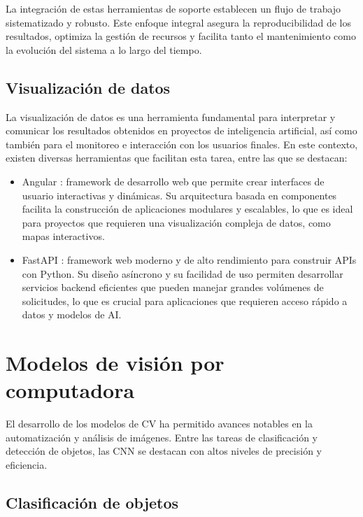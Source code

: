 La integración de estas herramientas de soporte establecen un flujo de trabajo sistematizado y robusto. Este enfoque integral asegura la reproducibilidad de los resultados, optimiza la gestión de recursos y facilita tanto el mantenimiento como la evolución del sistema a lo largo del tiempo.

\subsection{Visualización de datos}
\label{sec:visualizacionDatos}

La visualización de datos es una herramienta fundamental para interpretar y comunicar los resultados obtenidos en proyectos de inteligencia artificial, así como también para el monitoreo e interacción con los usuarios finales. En este contexto, existen diversas herramientas que facilitan esta tarea, entre las que se destacan:
\begin{itemize}
	\item Angular \citep{google_angular_nodate}: framework de desarrollo web que permite crear interfaces de usuario interactivas y dinámicas. Su arquitectura basada en componentes facilita la construcción de aplicaciones modulares y escalables, lo que es ideal para proyectos que requieren una visualización compleja de datos, como mapas interactivos.
	\item FastAPI \citep{tiangolo_fastapi_nodate}: framework web moderno y de alto rendimiento para construir APIs con Python. Su diseño asíncrono y su facilidad de uso permiten desarrollar servicios backend eficientes que pueden manejar grandes volúmenes de solicitudes, lo que es crucial para aplicaciones que requieren acceso rápido a datos y modelos de AI.
\end{itemize}

\section{Modelos de visión por computadora}
\label{sec:modelosVisPC}

El desarrollo de los modelos de CV ha permitido avances notables en la automatización y análisis de imágenes. Entre las tareas de clasificación y detección de objetos, las CNN se destacan con altos niveles de precisión y eficiencia.

\subsection{Clasificación de objetos}

